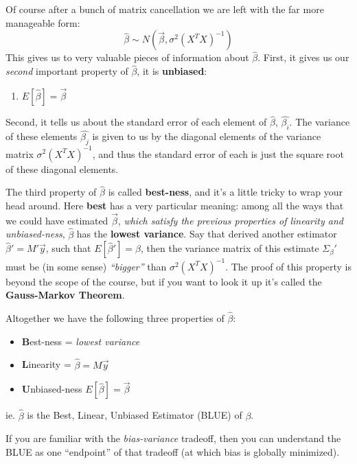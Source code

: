 \documentclass[
]{article}
\providecommand{\tightlist}{%
  \setlength{\itemsep}{0pt}\setlength{\parskip}{0pt}}
\begin{document}
Of course after a bunch of matrix cancellation we are left with the far
more manageable form: \[
\hat{\beta} \sim N( \vec{\beta}, \sigma^2 (X^TX)^{-1} )
\] This gives us to very valuable pieces of information about
\(\hat{\beta}\). First, it gives us our \emph{second} important property
of \(\hat{\beta}\), it is \textbf{unbiased}:

\begin{enumerate}
\def\labelenumi{\arabic{enumi}.}
\setcounter{enumi}{1}
\tightlist
\item
  \(E[\hat{\beta}] = \vec{\beta}\)
\end{enumerate}

Second, it tells us about the standard error of each element of
\(\hat{\beta}\), \(\hat{\beta_i}\). The variance of these elements
\(\hat{\beta_j}\) is given to us by the diagonal elements of the
variance matrix \(\sigma^2 (X^TX)^{-1}\), and thus the standard error of
each is just the square root of these diagonal elements.

The third property of \(\hat{\beta}\) is called \textbf{best-ness}, and
it's a little tricky to wrap your head around. Here \textbf{best} has a
very particular meaning: among all the ways that we could have estimated
\(\vec{\beta}\), \emph{which satisfy the previous properties of
linearity and unbiased-ness}, \(\hat{\beta}\) has the \textbf{lowest
variance}. Say that derived another estimator
\(\hat{\beta}' = M' \vec{y}\), such that \(E[\hat{\beta}'] = \beta\),
then the variance matrix of this estimate \(\Sigma_{\beta}'\) must be
(in some sense) \emph{``bigger''} than \(\sigma^2 (X^TX)^{-1}\). The
proof of this property is beyond the scope of the course, but if you
want to look it up it's called the \textbf{Gauss-Markov Theorem}.

Altogether we have the following three properties of \(\hat{\beta}\):

\begin{itemize}
\tightlist
\item
  \textbf{B}est-ness = \emph{lowest variance}
\item
  \textbf{L}inearity = \(\hat{\beta} = M \vec{y}\)
\item
  \textbf{U}nbiased-ness \(E[\hat{\beta}] = \vec{\beta}\)
\end{itemize}

ie. \(\hat{\beta}\) is the Best, Linear, Unbiased Estimator (BLUE) of
\(\beta\).

If you are familiar with the \emph{bias-variance} tradeoff, then you can
understand the BLUE as one ``endpoint'' of that tradeoff (at which bias
is globally minimized).
\end{document}
